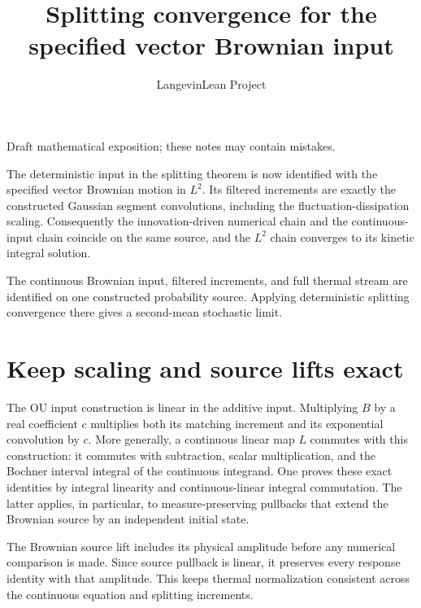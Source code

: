 \documentclass[11pt,a4paper]{article}
\title{\texorpdfstring{Splitting convergence for the specified vector Brownian input}{Splitting convergence for the specified vector Brownian input}}
\author{LangevinLean Project}
\date{}
\begin{document}
\maketitle
Draft mathematical exposition; these notes may contain mistakes.


The deterministic input in the splitting theorem is now identified with the specified vector Brownian motion in \(L^{2}\). Its filtered increments are exactly the constructed Gaussian segment convolutions, including the fluctuation-dissipation scaling. Consequently the innovation-driven numerical chain and the continuous-input chain coincide on the same source, and the \(L^{2}\) chain converges to its kinetic integral solution.



The continuous Brownian input, filtered increments, and full thermal stream are identified on one constructed probability source. Applying deterministic splitting convergence there gives a second-mean stochastic limit.


\section{\texorpdfstring{Keep scaling and source lifts exact}{Keep scaling and source lifts exact}}


The OU input construction is linear in the additive input. Multiplying \(B\) by a real coefficient \(c\) multiplies both its matching increment and its exponential convolution by \(c\). More generally, a continuous linear map \(L\) commutes with this construction: it commutes with subtraction, scalar multiplication, and the Bochner interval integral of the continuous integrand. One proves these exact identities by integral linearity and continuous-linear integral commutation. The latter applies, in particular, to measure-preserving pullbacks that extend the Brownian source by an independent initial state.



The Brownian source lift includes its physical amplitude before any numerical comparison is made. Since source pullback is linear, it preserves every response identity with that amplitude. This keeps thermal normalization consistent across the continuous equation and splitting increments.
\end{document}
